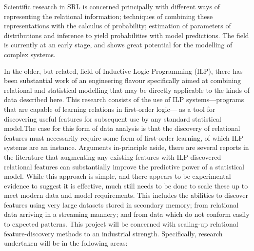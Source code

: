 \documentclass[11pt]{article}
\begin{document}
\noindent
Scientific research in SRL is concerned principally with different ways of representing the relational
information; techniques of combining these representations with the calculus of probability; estimation of
parameters of distributions and inference to yield probabilities with model predictions. The field
is currently at an early stage, and shows great potential for the modelling of complex systems.

In the older, but related, field of Inductive Logic Programming (ILP), there has been substantial
work of an engineering flavour specifically aimed at combining relational and statistical modelling that
may be directly applicable to the kinds of data described here.
This research consists of the use of ILP systems---programs that are capable
of learning relations in first-order logic---
as a tool for discovering useful features for subsequent use by any standard statistical model.The case for this form of data analysis is that the discovery of relational features must necessarily require some form of first-order
learning, of which ILP systems are an instance.
Arguments in-principle aside, there are several reports in the literature that augmenting any existing
features with ILP-discovered relational features can substantially improve the predictive power of a
statistical model. While this approach is simple, and there appears to be experimental evidence to suggest
it is effective, much still needs to be done to scale these up to meet modern data and model
requirements. This includes the abilities to discover features using
very large datasets stored in secondary memory; from relational data arriving in a streaming mannery; and from
data which do not conform easily to expected patterns. This project will be concerned with scaling-up relational
feature-discovery methods to an industrial strength. Specifically, research undertaken will be in the
following areas:
\end{document}

